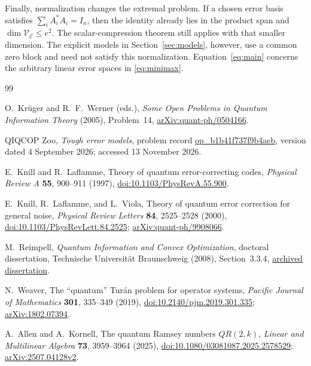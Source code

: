 \documentclass[11pt]{article}
\newcommand{\E}{\mathcal E}
\newcommand{\V}{\mathcal V}
\theoremstyle{remark}
\numberwithin{equation}{section}
\begin{document}
Finally, normalization changes the extremal problem. If a chosen error
basis satisfies $\sum_i A_i^*A_i=I_n$, then the identity already lies
in the product span and $\dim\V_{\E}\le e^2$. The scalar-compression
theorem still applies with that smaller dimension. The explicit models
in Section~\ref{sec:models}, however, use a common zero block and need
not satisfy this normalization. Equation~\eqref{eq:main} concerns the
arbitrary linear error spaces in \eqref{eq:minimax}.

\begin{thebibliography}{99}
\raggedright
{}
O.~Kr\"uger and R.~F.~Werner (eds.),
\emph{Some Open Problems in Quantum Information Theory} (2005),
Problem~14, \href{https://arxiv.org/abs/quant-ph/0504166}{arXiv:quant-ph/0504166}.

QIQCOP Zoo, \emph{Tough error models}, problem record
\href{https://qiqc-op.com/problem/op_b1b41f737f9b4aeb/}{op\_b1b41f737f9b4aeb},
version dated 4 September 2026; accessed 13 November 2026.

E.~Knill and R.~Laflamme, Theory of quantum error-correcting codes,
\emph{Physical Review A} \textbf{55}, 900--911 (1997),
\href{https://doi.org/10.1103/PhysRevA.55.900}{doi:10.1103/PhysRevA.55.900}.

E.~Knill, R.~Laflamme, and L.~Viola,
Theory of quantum error correction for general noise,
\emph{Physical Review Letters} \textbf{84}, 2525--2528 (2000),
\href{https://doi.org/10.1103/PhysRevLett.84.2525}{doi:10.1103/PhysRevLett.84.2525};
\href{https://arxiv.org/abs/quant-ph/9908066}{arXiv:quant-ph/9908066}.

M.~Reimpell, \emph{Quantum Information and Convex Optimization},
doctoral dissertation, Technische Universit\"at Braunschweig (2008),
Section~3.3.4,
\href{https://www.osti.gov/etdeweb/servlets/purl/21161752}{archived dissertation}.

N.~Weaver, The ``quantum'' Tur\'an problem for operator systems,
\emph{Pacific Journal of Mathematics} \textbf{301}, 335--349 (2019),
\href{https://doi.org/10.2140/pjm.2019.301.335}{doi:10.2140/pjm.2019.301.335};
\href{https://arxiv.org/abs/1802.07394}{arXiv:1802.07394}.

A.~Allen and A.~Kornell, The quantum Ramsey numbers $QR(2,k)$,
\emph{Linear and Multilinear Algebra} \textbf{73}, 3959--3964 (2025),
\href{https://doi.org/10.1080/03081087.2025.2578529}{doi:10.1080/03081087.2025.2578529};
\href{https://arxiv.org/abs/2507.04128v2}{arXiv:2507.04128v2}.


\end{thebibliography}
\end{document}
